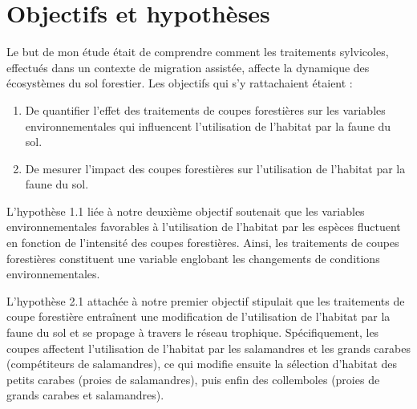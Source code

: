 \section*{Objectifs et hypothèses}
\label{sec:objectifs}

Le but de mon étude était de comprendre comment les traitements sylvicoles, effectués dans un contexte de migration assistée, 
affecte la dynamique des écosystèmes du sol forestier. Les objectifs qui s’y rattachaient étaient :

\begin{enumerate}
    \item De quantifier l'effet des traitements de coupes forestières sur les variables environnementales qui influencent l'utilisation de l'habitat par la faune du sol.
    \item De mesurer l'impact des coupes forestières sur l'utilisation de l'habitat par la faune du sol.
\end{enumerate}

L'hypothèse 1.1 liée à notre deuxième objectif soutenait que les variables environnementales favorables à l'utilisation de l'habitat par les espèces fluctuent 
en fonction de l'intensité des coupes forestières. Ainsi, les traitements de coupes forestières constituent une variable englobant 
les changements de conditions environnementales.

L'hypothèse 2.1 attachée à notre premier objectif stipulait que les traitements de coupe forestière entraînent une modification de l'utilisation de l'habitat 
par la faune du sol et se propage à travers le réseau trophique. Spécifiquement, les coupes affectent l'utilisation de l'habitat par les salamandres et 
les grands carabes (compétiteurs de salamandres), ce qui modifie ensuite la sélection d'habitat des petits carabes (proies de salamandres), puis enfin des collemboles (proies de grands carabes et salamandres).



\cleardoublepage



